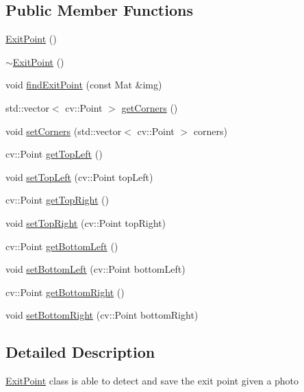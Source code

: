 \subsection*{Public Member Functions}
\begin{DoxyCompactItemize}
\item 
\mbox{\hyperlink{class_exit_point_ae472f935e952356c9bfe64298474d523}{Exit\+Point}} ()
\item 
\mbox{\hyperlink{class_exit_point_aa764fee5b37cb7dbda6f2fde39ffbc05}{$\sim$\+Exit\+Point}} ()
\item 
void \mbox{\hyperlink{class_exit_point_a2762c0c61bbe71a1a292b86e9517e860}{find\+Exit\+Point}} (const Mat \&img)
\item 
std\+::vector$<$ cv\+::\+Point $>$ \mbox{\hyperlink{class_exit_point_ac26a595a35b370cf7375874395715af0}{get\+Corners}} ()
\item 
void \mbox{\hyperlink{class_exit_point_aff4341c31734d77224b1251988949430}{set\+Corners}} (std\+::vector$<$ cv\+::\+Point $>$ corners)
\item 
cv\+::\+Point \mbox{\hyperlink{class_exit_point_ad373de21603871832e10568631ef3cda}{get\+Top\+Left}} ()
\item 
void \mbox{\hyperlink{class_exit_point_a31c88803968c8b215062b97b699721e2}{set\+Top\+Left}} (cv\+::\+Point top\+Left)
\item 
cv\+::\+Point \mbox{\hyperlink{class_exit_point_a448716aa575ba751f72ab0f437b6a138}{get\+Top\+Right}} ()
\item 
void \mbox{\hyperlink{class_exit_point_ae27c395eb18321cb120b99ffbed6028a}{set\+Top\+Right}} (cv\+::\+Point top\+Right)
\item 
cv\+::\+Point \mbox{\hyperlink{class_exit_point_a51ac01267f39908e468ec859ba8d3096}{get\+Bottom\+Left}} ()
\item 
void \mbox{\hyperlink{class_exit_point_a22bf3a433b3567d36463699e16aaa86b}{set\+Bottom\+Left}} (cv\+::\+Point bottom\+Left)
\item 
cv\+::\+Point \mbox{\hyperlink{class_exit_point_a7a0e9d613aa361083bd4bf91f2080398}{get\+Bottom\+Right}} ()
\item 
void \mbox{\hyperlink{class_exit_point_afe10f2b0cf00b654dc1c95183462ed1a}{set\+Bottom\+Right}} (cv\+::\+Point bottom\+Right)
\end{DoxyCompactItemize}


\subsection{Detailed Description}
\mbox{\hyperlink{class_exit_point}{Exit\+Point}} class is able to detect and save the exit point given a photo 

